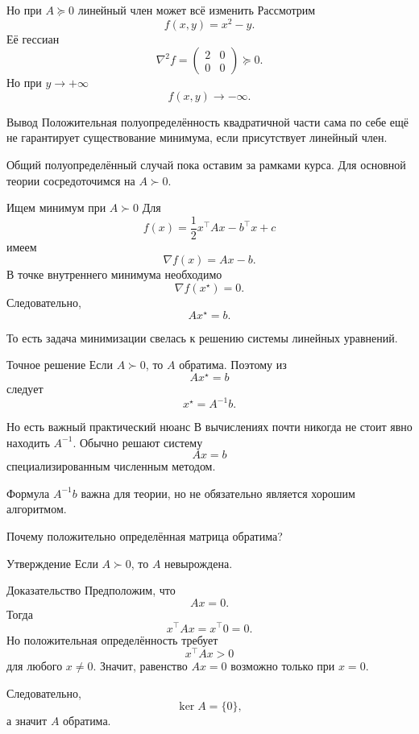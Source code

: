 \documentclass[aspectratio=169,10pt]{beamer}
\newcommand{\grad}{\nabla}
\newcommand{\Hess}{\nabla^2}
\begin{document}
\begin{frame}{Но при $A\succeq0$ линейный член может всё изменить}
\small
Рассмотрим
\[
 f(x,y)=x^2-y.
\]
Её гессиан
\[
 \Hess f=\begin{pmatrix}2&0\\0&0\end{pmatrix}\succeq0.
\]
Но при $y\to+\infty$
\[
 f(x,y)\to-\infty.
\]

\begin{alertblock}{Вывод}
Положительная полуопределённость квадратичной части сама по себе ещё не гарантирует существование минимума, если присутствует линейный член.
\end{alertblock}

Общий полуопределённый случай пока оставим за рамками курса. Для основной теории сосредоточимся на $A\succ0$.
\end{frame}

\begin{frame}{Ищем минимум при $A\succ0$}
\small
Для
\[
 f(x)=\frac12x^\top Ax-b^\top x+c
\]
имеем
\[
 \grad f(x)=Ax-b.
\]
В точке внутреннего минимума необходимо
\[
 \grad f(x^\star)=0.
\]
Следовательно,
\[
 \boxed{Ax^\star=b.}
\]

То есть задача минимизации свелась к решению системы линейных уравнений.
\end{frame}

\begin{frame}{Точное решение}
\vspace{0.8em}
Если $A\succ0$, то $A$ обратима. Поэтому из
\[
 Ax^\star=b
\]
следует
\[
 \boxed{x^\star=A^{-1}b.}
\]

\begin{alertblock}{Но есть важный практический нюанс}
В вычислениях почти никогда не стоит явно находить $A^{-1}$. Обычно решают систему
\[
 Ax=b
\]
специализированным численным методом.
\end{alertblock}

Формула $A^{-1}b$ важна для теории, но не обязательно является хорошим алгоритмом.
\end{frame}

\begin{frame}{Почему положительно определённая матрица обратима?}
\small
\begin{block}{Утверждение}
Если $A\succ0$, то $A$ невырождена.
\end{block}

\begin{block}{Доказательство}
Предположим, что
\[
 Ax=0.
\]
Тогда
\[
 x^\top Ax=x^\top0=0.
\]
Но положительная определённость требует
\[
 x^\top Ax>0
\]
для любого $x\ne0$. Значит, равенство $Ax=0$ возможно только при $x=0$.

Следовательно,
\[
 \ker A=\{0\},
\]
а значит $A$ обратима.
\end{block}
\end{frame}
\end{document}
